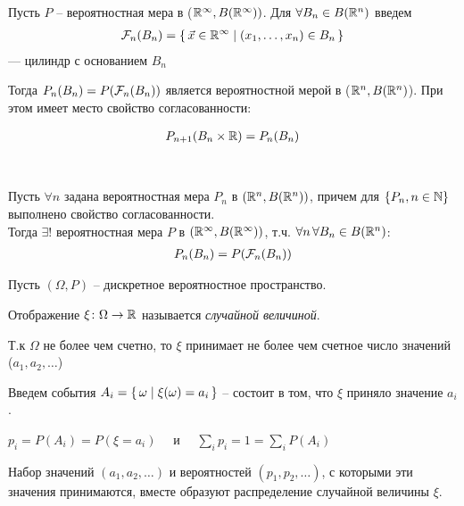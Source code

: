 
Пусть $P$ -- вероятностная мера в ($\mathbb{R}^{\infty}, B(\mathbb{R}^{\infty}))$.
Для $\forall B_n \in B(\mathbb{R}^n)$ введем
\begin{align*}
	\mathcal{F}_n (B_n) = \left\{ \, \vec{x} \in \mathbb{R}^{\infty} \mid (x_1, \ldots, x_n) \in B_n \, \right\}
\end{align*}
--- цилиндр с основанием $B_n$

Тогда $P_n(B_n) = P(\mathcal{F}_n(B_n))$ является вероятностной мерой в ($\mathbb{R}^n, B(\mathbb{R}^n)$).
При этом имеет место свойство согласованности:

\begin{align*}
	P_{n + 1}(B_n \times \mathbb{R}) = P_n(B_n)
\end{align*}

\begin{theorem}~

	Пусть $\forall n$ задана вероятностная мера $P_n$  в $(\mathbb{R}^n, B(\mathbb{R}^n))$, 
	причем для $\{ P_n, n \in \mathbb{N} \}$ выполнено свойство согласованности.\\
	Тогда $\exists !$ вероятностная мера $P$ в $(\mathbb{R}^{\infty}, B(\mathbb{R}^{\infty}))$,
	т.ч. $\forall n \, \forall B_n \in B(\mathbb{R}^n)$:
	\begin{align*}
		P_n(B_n) = P(\mathcal{F}_n(B_n))
	\end{align*}
\end{theorem}


Пусть $(\Omega, P)$ -- дискретное вероятностное пространство.

\begin{definition}
	Отображение $\xi\colon \Omega \to \mathbb{R}$ называется \emph{случайной величиной}.

	Т.к $\Omega$ не более чем счетно, 
	то $\xi$ принимает не более чем счетное число значений ($a_1, a_2, \ldots$)

	Введем события $A_i = \left\{ \, \omega \mid \xi(\omega) = a_i \, \right\}$ 
	-- состоит в том, что $\xi$ приняло значение $a_i$.
	
	$p_i = P(A_i) = P(\xi = a_i) \quad$ и $\quad \sum\limits_i p_i = 1 = \sum\limits_i P(A_i)$
\end{definition}

\begin{definition}
	Набор значений $(a_1, a_2, \ldots)$ и вероятностей $(p_1, p_2, \ldots)$, с которыми эти значения принимаются, вместе образуют распределение случайной величины $\xi$.
\end{definition}

